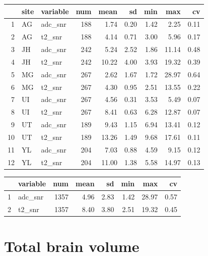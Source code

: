 \documentclass[
]{article}
\begin{document}
\begin{table}[ht]
\centering
\begin{tabular}{rllrrrrrr}
  \hline
 & site & variable & num & mean & sd & min & max & cv \\ 
  \hline
1 & AG & adc\_snr & 188 & 1.74 & 0.20 & 1.42 & 2.25 & 0.11 \\ 
  2 & AG & t2\_snr & 188 & 4.14 & 0.71 & 3.00 & 5.96 & 0.17 \\ 
  3 & JH & adc\_snr & 242 & 5.24 & 2.52 & 1.86 & 11.14 & 0.48 \\ 
  4 & JH & t2\_snr & 242 & 10.22 & 4.00 & 3.93 & 19.32 & 0.39 \\ 
  5 & MG & adc\_snr & 267 & 2.62 & 1.67 & 1.72 & 28.97 & 0.64 \\ 
  6 & MG & t2\_snr & 267 & 4.30 & 0.95 & 2.51 & 13.55 & 0.22 \\ 
  7 & UI & adc\_snr & 267 & 4.56 & 0.31 & 3.53 & 5.49 & 0.07 \\ 
  8 & UI & t2\_snr & 267 & 8.41 & 0.63 & 6.28 & 12.87 & 0.07 \\ 
  9 & UT & adc\_snr & 189 & 9.43 & 1.15 & 6.94 & 13.41 & 0.12 \\ 
  10 & UT & t2\_snr & 189 & 13.26 & 1.49 & 9.68 & 17.61 & 0.11 \\ 
  11 & YL & adc\_snr & 204 & 7.03 & 0.88 & 4.59 & 9.15 & 0.12 \\ 
  12 & YL & t2\_snr & 204 & 11.00 & 1.38 & 5.58 & 14.97 & 0.13 \\ 
   \hline
\end{tabular}
\end{table}
\begin{table}[ht]
\centering
\begin{tabular}{rlrrrrrr}
  \hline
 & variable & num & mean & sd & min & max & cv \\ 
  \hline
1 & adc\_snr & 1357 & 4.96 & 2.83 & 1.42 & 28.97 & 0.57 \\ 
  2 & t2\_snr & 1357 & 8.40 & 3.80 & 2.51 & 19.32 & 0.45 \\ 
   \hline
\end{tabular}
\end{table}

\hypertarget{total-brain-volume}{%
\section{Total brain volume}\label{total-brain-volume}}
\end{document}
